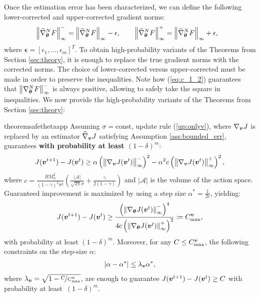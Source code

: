 Once the estimation error has been characterized,
we can define the following lower-corrected and upper-corrected gradient norms:
\begin{align*}
&\norm[\infty]{\widehat{\nabla}_{\vtheta}^NF}^- = \norm[\infty]{\widehat{\nabla}_{\vtheta}^NF} - \mathbf{\epsilon},  \qquad \norm[\infty]{\widehat{\nabla}_{\vtheta}^NF}^+ = \norm[\infty]{\widehat{\nabla}_{\vtheta}^NF} + \mathbf{\epsilon},
\end{align*}
where $\mathbf{\epsilon}=[\epsilon_1,\dots,\epsilon_m]^T$. To obtain high-probability variants of the Theorems from Section \ref{sec:theory}, it is enough to replace the true gradient norms with the corrected norms. The choice of lower-corrected versus upper-corrected must be made in order to preserve the inequalities. Note how (\ref{eq:c_1_2}) guarantees that $\norm[\infty]{\nabla_{\vtheta}^NF}^-$ is always positive, allowing to safely take the square in inequalities. We now provide the high-probability variants of the Theorems from Section \ref{sec:theory}:

\begin{restatable}{theorem}{safethetaapp}\label{th:safethetaapp}
	Assuming $\sigma = \text{const}$, update rule (\ref{up:onlyv}), where $\nabla_{\vv}J$ is replaced by an estimator $\widehat{\nabla}_{\vv}J$ satisfying Assumption \ref{ass:bounded_err}, guarantees \textbf{with probability at least $(1-\delta)^m$}:
	\begin{align}
	J(\vv^{t+1}) - J(\vv^t) \geq \alpha\left(\norm[\infty]{\gradJ[\vv]{\vv^t}}^-\right)^2 - 
	\alpha^2 c \left(\norm[\infty]{\gradJ[\vv]{\vv^t}}^+\right)^2,
	\end{align}
	where $c = \frac{RM_{\phi}^2}{(1-\gamma)^2\sigma^2}\left(\frac{|\mathcal{A}|}{\sqrt{2\pi}\sigma} +	\frac{\gamma}{2(1-\gamma)}\right)$ and  $|\mathcal{A}|$ is the volume of the action space. Guaranteed improvement is maximized by using a step size $\alpha^* = \frac{1}{2c}$, yielding:
	\begin{align}
	J(\vv^{t+1}) - J(\vv^t) \geq \frac{\left(\norm[\infty]{\gradJ{\vv^t}}^-\right)^4}{4c\left(\norm[\infty]{\gradJ{\vv^t}}^+\right)^2}
	\coloneqq C_{\text{max}}^{\vv},
	\end{align}
	with probability at least $(1-\delta)^m$. Moreover, for any $C\leq C_{\text{max}}^{\vv}$, the following constraints on the step-size $\alpha$:
	\begin{align}
	|\alpha - \alpha^*| \leq \lambda_{\vv}\alpha^*, 
	\end{align}
	where $\lambda_{\vv}=\sqrt{1 - \nicefrac{C}{C_{\text{max}}^{\vv}}}$, are enough to guarantee $J(\vv^{t+1}) - J(\vv^t)\geq C$ with probability at least~${(1-\delta)^m}$.
\end{restatable}

